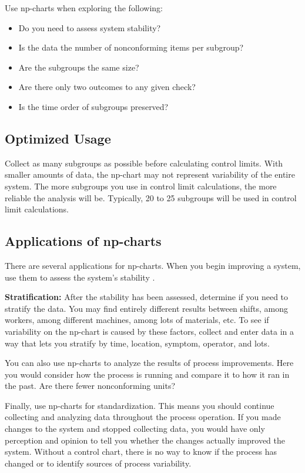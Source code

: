 \documentclass[a4paper,12pt]{article}
\begin{document}
Use np-charts when exploring the following:

\begin{itemize}
\item Do you need to assess system stability?

\item Is the data the number of nonconforming items per subgroup?

\item Are the subgroups the same size?

\item Are there only two outcomes to any given check?

\item Is the time order of subgroups preserved?
\end{itemize}

\subsection{Optimized Usage}
Collect as many subgroups as possible before calculating control limits. With smaller amounts of data, the np-chart may not represent variability of the entire system. The more subgroups you use in control limit calculations, the more reliable the analysis will be. Typically, 20 to 25 subgroups will be used in control limit calculations.

\subsection{Applications of np-charts}
There are several applications for np-charts. When you begin improving a system, use them to assess the system’s stability .

\noindent \textbf{Stratification:} After the stability has been assessed, determine if you need to stratify the data. You may find entirely different results between shifts, among workers, among different machines, among lots of materials, etc. To see if variability on the np-chart is caused by these factors, collect and enter data in a way that lets you stratify by time, location, symptom, operator, and lots.

You can also use np-charts to analyze the results of process improvements. Here you would consider how the process is running and compare it to how it ran in the past. Are there fewer nonconforming units?

Finally, use np-charts for standardization. This means you should continue collecting and analyzing data throughout the process operation. If you made changes to the system and stopped collecting data, you would have only perception and opinion to tell you whether the changes actually improved the system. Without a control chart, there is no way to know if the process has changed or to identify sources of process variability.
\newpage
\end{document}
